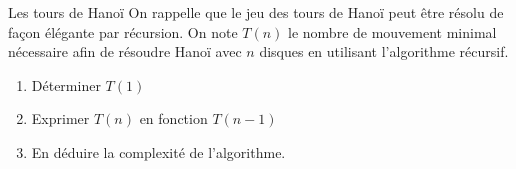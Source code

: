 \documentclass[10pt,french]{beamer}
\begin{document}
\begin{frame}[fragile]{\Ctitle}{\stitle}
	\begin{exampleblock}{Les tours de Hanoï}
		On rappelle que le jeu des tours de Hanoï peut être résolu de façon élégante par récursion. On note $T(n)$ le nombre de mouvement minimal nécessaire afin de résoudre Hanoï avec $n$ disques en utilisant l'algorithme récursif.
		\begin{enumerate}
			\item Déterminer $T(1)$
			\item Exprimer $T(n)$ en fonction $T(n-1)$
			\item En déduire la complexité de l'algorithme.
		\end{enumerate}
	\end{exampleblock}
\end{frame}
\end{document}
